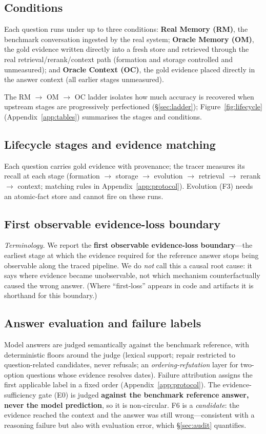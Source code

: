 \documentclass[11pt]{article}
\begin{document}
\subsection{Conditions}

Each question runs under up to three conditions: \textbf{Real Memory (RM)}, the
benchmark conversation ingested by the real system; \textbf{Oracle Memory
(OM)}, the gold evidence written directly into a fresh store and retrieved
through the real retrieval/rerank/context path (formation and storage
controlled and unmeasured); and \textbf{Oracle Context (OC)}, the gold
evidence placed directly in the answer context (all earlier stages
unmeasured).

The RM $\to$ OM $\to$ OC ladder isolates how much accuracy is recovered when
upstream stages are progressively perfectioned (\S\ref{sec:ladder});
Figure~\ref{fig:lifecycle} (Appendix~\ref{app:tables}) summarises the stages
and conditions.


\subsection{Lifecycle stages and evidence matching}

Each question carries gold evidence with provenance; the tracer measures its
recall at each stage (formation $\to$ storage $\to$ evolution $\to$ retrieval
$\to$ rerank $\to$ context; matching rules in
Appendix~\ref{app:protocol}). Evolution (F3) needs an atomic-fact store and
cannot fire on these runs.

\subsection{First observable evidence-loss boundary}

\emph{Terminology.} We report the \textbf{first observable evidence-loss
boundary}---the earliest stage at which the evidence required for the
reference answer stops being observable along the traced pipeline. We do \emph{not} call this a causal root cause: it says where evidence
became unobservable, not which mechanism counterfactually caused the wrong
answer. (Where ``first-loss'' appears in
code and artifacts it is shorthand for this boundary.)

\subsection{Answer evaluation and failure labels}

Model answers are judged semantically against the benchmark reference, with
deterministic floors around the judge (lexical support; repair restricted to
question-related candidates, never refusals; an \emph{ordering-refutation}
layer for two-option questions whose evidence resolves dates). Failure
attribution assigns the first applicable label in a fixed order
(Appendix~\ref{app:protocol}). The
evidence-sufficiency gate (E0) is judged \textbf{against the benchmark
reference answer, never the model prediction}, so it is non-circular. F6 is a
\emph{candidate}: the evidence reached the context and the answer was still
wrong---consistent with a reasoning failure but also with evaluation error,
which \S\ref{sec:audit} quantifies.
\end{document}
